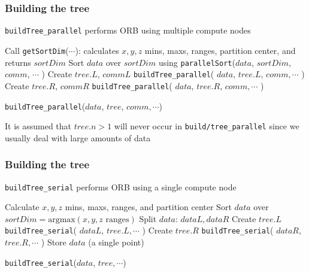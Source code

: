 \documentclass[usernames,dvipsnames]{beamer}
\begin{document}
\begin{frame}
	\frametitle{Building the tree}
	
	\texttt{buildTree\_parallel} performs ORB using multiple compute nodes
	
	\vspace{10pt}
	
	\begin{algorithm}[H]
		\footnotesize
		\begin{algorithmic}[1]
			\STATE Call \texttt{getSortDim}($\cdots$): calculates $x,y,z$ mins, maxs, ranges, partition center, and returns $sortDim$
			\STATE Sort $data$ over $sortDim$ using \texttt{parallelSort}($data$, $sortDim$, $comm$, $\cdots$ )
				\STATE Create $tree.L$, $commL$
				\STATE \texttt{buildTree\_parallel}( $data$, $tree.L$, $comm, \cdots$ )
			\ELSE
				\STATE Create $tree.R$, $commR$
				\STATE \texttt{buildTree\_parallel}( $data$, $tree.R$, $comm, \cdots$ )
			\ENDIF
		\end{algorithmic}
		\caption{\texttt{buildTree\_parallel}($data$, $tree$, $comm, \cdots$)}
	\end{algorithm}
	
	\vspace{10pt}
	
	It is assumed that $tree.n > 1$ will never occur in \texttt{build/tree\_parallel} since we usually deal with large amounts of data
		
\end{frame}

\begin{frame}
	\frametitle{Building the tree}
	
	\texttt{buildTree\_serial} performs ORB using a single compute node
	
	\vspace{10pt}
	
	\begin{algorithm}[H]
		\footnotesize
		\begin{algorithmic}[1]
				\STATE Calculate $x,y,z$ mins, maxs, ranges, and partition center
				\STATE Sort $data$ over $sortDim = \textrm{argmax}( x,y,z \textrm{ ranges})$
				\STATE Split $data$: $dataL, dataR$
					\STATE Create $tree.L$
					\STATE \texttt{buildTree\_serial}( $dataL$, $tree.L, \cdots$ )
				\ENDIF
					\STATE Create $tree.R$
					\STATE \texttt{buildTree\_serial}( $dataR$, $tree.R, \cdots$ )
				\ENDIF
			\ELSE
				\STATE Store $data$ (a single point)
			\ENDIF
		\end{algorithmic}
	\caption{\texttt{buildTree\_serial}($data$, $tree, \cdots$)}
	\end{algorithm}
		
\end{frame}
\end{document}

